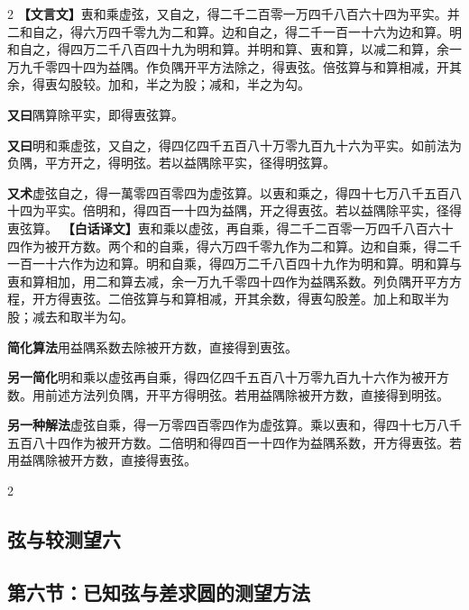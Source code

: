 \documentclass[11pt,a4paper]{article}
\begin{document}
\begin{paracol}{2}
\switchcolumn*
\small\textbf{【文言文】}\quad 叀和乘虚弦，又自之，得二千二百零一万四千八百六十四为平实。并二和自之，得六万四千零九为二和算。边和自之，得二千一百一十六为边和算。明和自之，得四万二千八百四十九为明和算。并明和算、叀和算，以减二和算，余一万九千零四十四为益隅。作负隅开平方法除之，得叀弦。倍弦算与和算相减，开其余，得叀勾股较。加和，半之为股；减和，半之为勾。

\vspace{0.3em}
\textbf{又曰}\quad 隅算除平实，即得叀弦算。

\textbf{又曰}\quad 明和乘虚弦，又自之，得四亿四千五百八十万零九百九十六为平实。如前法为负隅，平方开之，得明弦。若以益隅除平实，径得明弦算。

\textbf{又术}\quad 虚弦自之，得一萬零四百零四为虚弦算。以叀和乘之，得四十七万八千五百八十四为平实。倍明和，得四百一十四为益隅，开之得叀弦。若以益隅除平实，径得叀弦算。
\switchcolumn
\small\textbf{【白话译文】}\quad 叀和乘以虚弦，再自乘，得二千二百零一万四千八百六十四作为被开方数。两个和的自乘，得六万四千零九作为二和算。边和自乘，得二千一百一十六作为边和算。明和自乘，得四万二千八百四十九作为明和算。明和算与叀和算相加，用二和算去减，余一万九千零四十四作为益隅系数。列负隅开平方方程，开方得叀弦。二倍弦算与和算相减，开其余数，得叀勾股差。加上和取半为股；减去和取半为勾。

\vspace{0.3em}
\textbf{简化算法}\quad 用益隅系数去除被开方数，直接得到叀弦。

\textbf{另一简化}\quad 明和乘以虚弦再自乘，得四亿四千五百八十万零九百九十六作为被开方数。用前述方法列负隅，开平方得明弦。若用益隅除被开方数，直接得到明弦。

\textbf{另一种解法}\quad 虚弦自乘，得一万零四百零四作为虚弦算。乘以叀和，得四十七万八千五百八十四作为被开方数。二倍明和得四百一十四作为益隅系数，开方得叀弦。若用益隅除被开方数，直接得叀弦。
\end{paracol}

\vspace{0.5em}

\begin{paracol}{2}
\subsection*{\textcolor{sectioncolor}{弦与较测望六}}
\switchcolumn
\subsection*{\textcolor{sectioncolor}{第六节：已知弦与差求圆的测望方法}}
\end{paracol}
\end{document}
